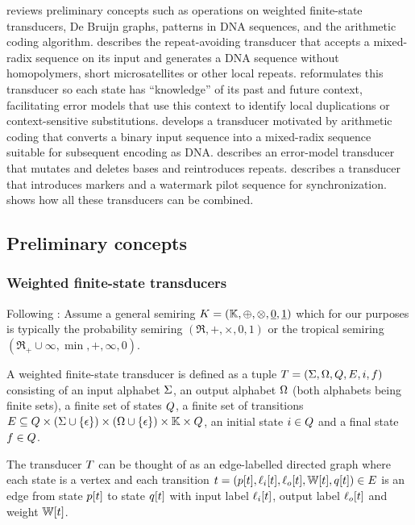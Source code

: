 \documentclass[english]{article}
\begin{document}
 reviews preliminary concepts such as operations on weighted finite-state transducers,
De Bruijn graphs, patterns in DNA sequences, and the arithmetic coding algorithm.
 describes the repeat-avoiding transducer that accepts a mixed-radix sequence on its input
and generates a DNA sequence without homopolymers, short microsatellites or other local repeats.
 reformulates this transducer so each state has ``knowledge'' of its past and future context,
facilitating error models that use this context to identify local duplications or context-sensitive substitutions.
 develops a transducer motivated by arithmetic coding
that converts a binary input sequence into a mixed-radix sequence suitable for subsequent encoding as DNA.
 describes an error-model transducer that mutates and deletes bases and reintroduces repeats.
 describes a transducer that introduces markers and a watermark pilot sequence for synchronization.
 shows how all these transducers can be combined.

\subsection{Preliminary concepts}

\subsubsection{Weighted finite-state transducers}

Following \cite{MohriPereiraRiley2000}:
Assume a general semiring
$K=(\mathbb{K},\oplus,\otimes,\underline{0},\underline{1})$
which for our purposes is typically the probability semiring
$(\Re,+,\times,0,1)$
or the tropical semiring
$(\Re_{+} \cup {\infty},\min,+,\infty,0)$.

A weighted finite-state transducer is defined as a tuple
$T = (\Sigma,\Omega,Q,E,i,f)$
consisting of an input alphabet $\Sigma$,
an output alphabet $\Omega$ (both alphabets being finite sets),
a finite set of states $Q$,
a finite set of transitions
$E \subseteq Q \times (\Sigma \cup \{ \epsilon \}) \times (\Omega \cup \{ \epsilon \}) \times \mathbb{K} \times Q$,
an initial state $i \in Q$
and a final state $f \in Q$.

The transducer $T$ can be thought of as an edge-labelled directed graph
where each state is a vertex
and each transition
$t = (p[t],\ell_i[t],\ell_o[t],\mathbb{W}[t],q[t]) \in E$
is an edge from state $p[t]$ to state $q[t]$
with input label $\ell_i[t]$,
output label $\ell_o[t]$
and weight $\mathbb{W}[t]$.
\end{document}
